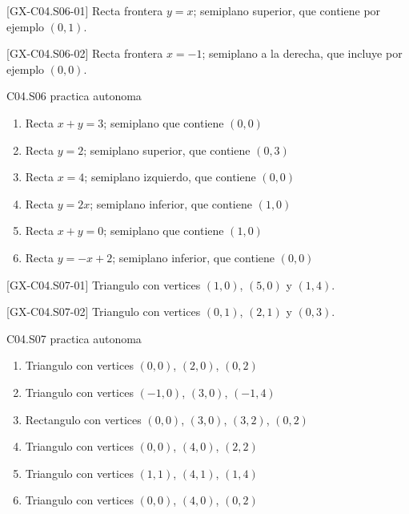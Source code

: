 \begin{shortanswer}{[GX-C04.S06-01]}
Recta frontera \(y=x\); semiplano superior, que contiene por ejemplo \((0,1)\).
\end{shortanswer}

\begin{shortanswer}{[GX-C04.S06-02]}
Recta frontera \(x=-1\); semiplano a la derecha, que incluye por ejemplo \((0,0)\).
\end{shortanswer}

\begin{shortanswer}{C04.S06 practica autonoma}
\begin{enumerate}[label=\textbf{PX-C04.S06-\arabic*:}, leftmargin=*]
  \item Recta \(x+y=3\); semiplano que contiene \((0,0)\)
  \item Recta \(y=2\); semiplano superior, que contiene \((0,3)\)
  \item Recta \(x=4\); semiplano izquierdo, que contiene \((0,0)\)
  \item Recta \(y=2x\); semiplano inferior, que contiene \((1,0)\)
  \item Recta \(x+y=0\); semiplano que contiene \((1,0)\)
  \item Recta \(y=-x+2\); semiplano inferior, que contiene \((0,0)\)
\end{enumerate}
\end{shortanswer}

\begin{shortanswer}{[GX-C04.S07-01]}
Triangulo con vertices \((1,0)\), \((5,0)\) y \((1,4)\).
\end{shortanswer}

\begin{shortanswer}{[GX-C04.S07-02]}
Triangulo con vertices \((0,1)\), \((2,1)\) y \((0,3)\).
\end{shortanswer}

\begin{shortanswer}{C04.S07 practica autonoma}
\begin{enumerate}[label=\textbf{PX-C04.S07-\arabic*:}, leftmargin=*]
  \item Triangulo con vertices \((0,0)\), \((2,0)\), \((0,2)\)
  \item Triangulo con vertices \((-1,0)\), \((3,0)\), \((-1,4)\)
  \item Rectangulo con vertices \((0,0)\), \((3,0)\), \((3,2)\), \((0,2)\)
  \item Triangulo con vertices \((0,0)\), \((4,0)\), \((2,2)\)
  \item Triangulo con vertices \((1,1)\), \((4,1)\), \((1,4)\)
  \item Triangulo con vertices \((0,0)\), \((4,0)\), \((0,2)\)
\end{enumerate}
\end{shortanswer}
